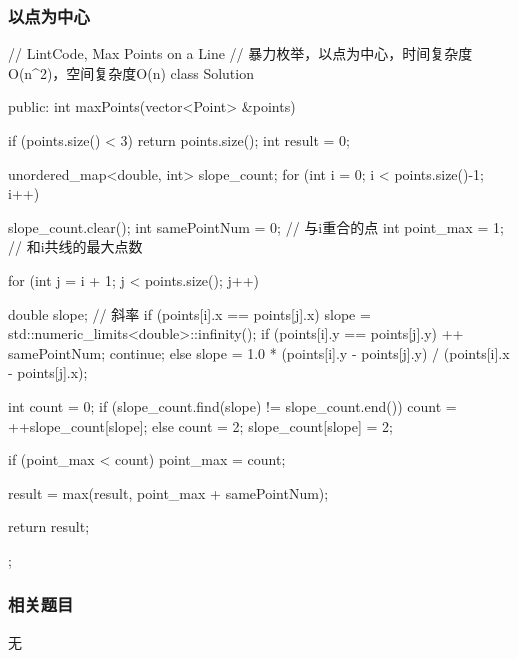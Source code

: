 \subsubsection{以点为中心}
\begin{Code}
// LintCode, Max Points on a Line
// 暴力枚举，以点为中心，时间复杂度O(n^2)，空间复杂度O(n)
class Solution {
public:
    int maxPoints(vector<Point> &points) {
        if (points.size() < 3) return points.size();
        int result = 0;

        unordered_map<double, int> slope_count;
        for (int i = 0; i < points.size()-1; i++) {
            slope_count.clear();
            int samePointNum = 0; // 与i重合的点
            int point_max = 1;    // 和i共线的最大点数

            for (int j = i + 1; j < points.size(); j++) {
                double slope; // 斜率
                if (points[i].x == points[j].x) {
                    slope = std::numeric_limits<double>::infinity();
                    if (points[i].y == points[j].y) {
                        ++ samePointNum;
                        continue;
                    }
                } else {
                    slope = 1.0 * (points[i].y - points[j].y) / 
                        (points[i].x - points[j].x);
                }

                int count = 0;
                if (slope_count.find(slope) != slope_count.end())
                    count = ++slope_count[slope];
                else {
                    count = 2;
                    slope_count[slope] = 2;
                }

                if (point_max < count) point_max = count;
            }
            result = max(result, point_max + samePointNum);
        }
        return result;
    }
};
\end{Code}


\subsubsection{相关题目}
\begindot
\item 无
\myenddot
